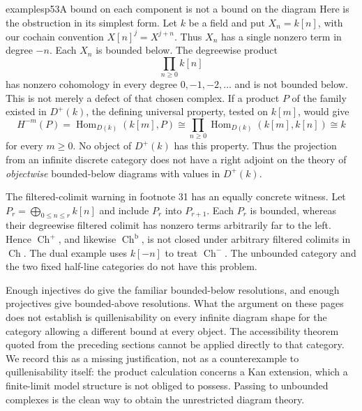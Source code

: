 \begin{dcomment}{examples}{p53}{A bound on each component is not a bound on the diagram}
Here is the obstruction in its simplest form. Let $k$ be a field and put $X_n=k[n]$, with our cochain convention $X[n]^j=X^{j+n}$. Thus $X_n$ has a single nonzero term in degree $-n$. Each $X_n$ is bounded below. The degreewise product
\[
                         \prod_{n\geq0} k[n]
\]
has nonzero cohomology in every degree $0,-1,-2,\ldots$ and is not bounded below. This is not merely a defect of that chosen complex. If a product $P$ of the family existed in $D^+(k)$, the defining universal property, tested on $k[m]$, would give
\[
 H^{-m}(P)=\operatorname{Hom}_{D(k)}(k[m],P)
 \cong\prod_{n\geq0}\operatorname{Hom}_{D(k)}(k[m],k[n])
 \cong k
\]
for every $m\geq0$. No object of $D^+(k)$ has this property. Thus the projection from an infinite discrete category does not have a right adjoint on the theory of \emph{objectwise} bounded-below diagrams with values in $D^+(k)$.

The filtered-colimit warning in footnote 31 has an equally concrete witness. Let $P_r=\bigoplus_{0\leq n\leq r}k[n]$ and include $P_r$ into $P_{r+1}$. Each $P_r$ is bounded, whereas their degreewise filtered colimit has nonzero terms arbitrarily far to the left. Hence $\operatorname{Ch}^+$, and likewise $\operatorname{Ch}^{\mathrm b}$, is not closed under arbitrary filtered colimits in $\operatorname{Ch}$. The dual example uses $k[-n]$ to treat $\operatorname{Ch}^-$. The unbounded category and the two fixed half-line categories do not have this problem.

Enough injectives do give the familiar bounded-below resolutions, and enough projectives give bounded-above resolutions. What the argument on these pages does not establish is quillenisability on every infinite diagram shape for the category allowing a different bound at every object. The accessibility theorem quoted from the preceding sections cannot be applied directly to that category. We record this as a missing justification, not as a counterexample to quillenisability itself: the product calculation concerns a Kan extension, which a finite-limit model structure is not obliged to possess. Passing to unbounded complexes is the clean way to obtain the unrestricted diagram theory.
\end{dcomment}

